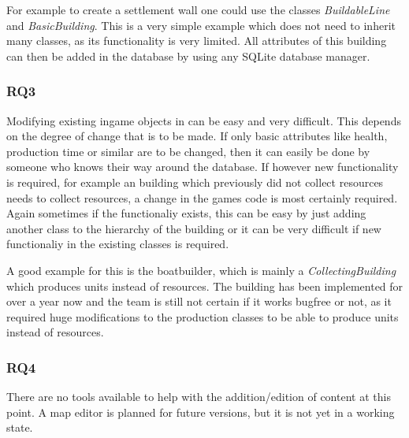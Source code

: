 For example to create a settlement wall one could use the classes \textit{BuildableLine} and
\textit{BasicBuilding}. This is a very simple example which does not need to inherit many classes, as its functionality
is very limited. All attributes of this building can then be added in the database by using any SQLite database manager.

\subsubsection{RQ3}
Modifying existing ingame objects in \UH{} can be easy and very difficult. This depends on the degree of
change that is to be made. If only basic attributes like health, production time or similar are to be changed, then it
can easily be done by someone who knows their way around the database. If however new functionality is required, for
example an building which previously did not collect resources needs to collect resources, a change in the games code is
most certainly required. Again sometimes if the functionaliy exists, this can be easy by just adding another class to
the hierarchy of the building or it can be very difficult if new functionaliy in the existing classes is required.

A good example for this is the boatbuilder, which is mainly a \textit{CollectingBuilding} which produces units instead of
resources. The building has been implemented for over a year now and the team is still not certain if it works bugfree
or not, as it required huge modifications to the production classes to be able to produce units instead of resources.

\subsubsection{RQ4}
There are no tools available to help with the addition/edition of content at this point. A map editor is planned for
future versions, but it is not yet in a working state.



